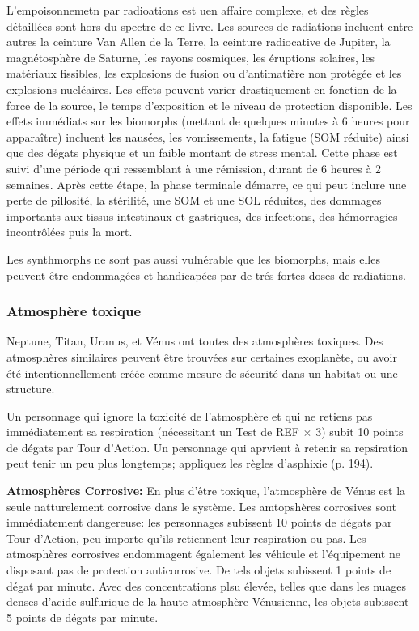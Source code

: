 L'empoisonnemetn par radioations est uen affaire complexe, et des règles détaillées sont hors du spectre de ce livre. Les sources de radiations incluent entre autres la ceinture Van Allen de la Terre, la ceinture radiocative de Jupiter, la magnétosphère de Saturne, les rayons cosmiques, les éruptions solaires, les matériaux fissibles, les explosions de fusion ou d'antimatière non protégée et les explosions nucléaires. Les effets peuvent varier drastiquement en fonction de la force de la source, le temps d'exposition et le niveau de protection disponible. Les effets immédiats sur les biomorphs (mettant de quelques minutes à 6 heures pour apparaître) incluent les nausées, les vomissements, la fatigue (SOM réduite) ainsi que des dégats physique et un faible montant de stress mental. Cette phase est suivi d'une période qui ressemblant à une rémission, durant de 6 heures à 2 semaines. Après cette étape, la phase terminale démarre, ce qui peut inclure une perte de pillosité, la stérilité, une SOM et une SOL réduites, des dommages importants aux tissus intestinaux et gastriques, des infections, des hémorragies incontrôlées puis la mort. 

Les synthmorphs ne sont pas aussi vulnérable que les biomorphs, mais elles peuvent être endommagées et handicapées par de trés fortes doses de radiations. 

\subsubsection{Atmosphère toxique} 

Neptune, Titan, Uranus, et Vénus ont toutes des atmosphères toxiques. Des atmosphères similaires peuvent être trouvées sur certaines exoplanète, ou avoir été intentionnellement créée comme mesure de sécurité dans un habitat ou une structure. 

Un personnage qui ignore la toxicité de l'atmosphère et qui ne retiens pas immédiatement sa respiration (nécessitant un Test de REF $\times$ 3) subit 10 points de dégats par Tour d'Action. Un personnage qui aprvient à retenir sa repsiration peut tenir un peu plus longtemps; appliquez les règles d'asphixie (p. 194). 

\textbf{Atmosphères Corrosive:} En plus d'être toxique, l'atmosphère de Vénus est la seule natturelement corrosive dans le système. Les amtopshères corrosives sont immédiatement dangereuse: les personnages subissent 10 points de dégats par Tour d'Action, peu importe qu'ils retiennent leur respiration ou pas. Les atmosphères corrosives endommagent également les véhicule et l'équipement ne disposant pas de protection anticorrosive. De tels objets subissent 1 points de dégat par minute. Avec des concentrations plsu élevée, telles que dans les nuages denses d'acide sulfurique de la haute atmosphère Vénusienne, les objets subissent 5 points de dégats par minute. 

